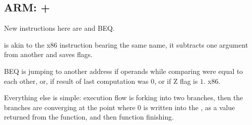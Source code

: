 \subsection{ARM: \OptimizingKeil + \ThumbMode}



{New instructions here are \CMP and \ac{BEQ}.}

\CMP {}
{is akin to the x86 instruction bearing the same name, it subtracts one argument from another and saves flags.}

\ac{BEQ} 
{is jumping to another address if operands while comparing were equal to each other, or,
if result of last computation was $0$, or if Z flag is $1$.}
 x86.

{Everything else is simple: execution flow is forking into two branches, then the branches are 
converging at the point
where $0$ is written into the , as a value returned from the function, and then function finishing.}

